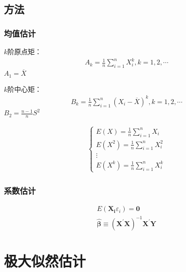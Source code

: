\documentclass[12pt]{book}
\begin{document}
\subsection{方法}

\subsubsection{均值估计}

\par $k$阶原点矩：
\begin{gather*}
    A_k=\frac{1}{n}\sum_{i=1}^{n}{X_i^k}, k=1,2,\cdots
\end{gather*}
$A_1=\overline{X}$
\par $k$阶中心矩：
\begin{gather*}
    B_k=\frac{1}{n}\sum_{i=1}^{n}{(X_i-\overline{X})^k}, k=1,2,\cdots
\end{gather*}
$B_2=\frac{n-1}{n}S^2$

\begin{gather*}
    \begin{cases}
        E(X) = \frac{1}{n}\sum_{i=1}^{n}{X_i}     \\
        E(X^2) = \frac{1}{n}\sum_{i=1}^{n}{X_i^2} \\
        \vdots                                    \\
        E(X^k) = \frac{1}{n}\sum_{i=1}^{n}{X_i^k}
    \end{cases}
\end{gather*}

\subsubsection{系数估计}

\begin{gather*}
    E( \mathbf{X_i} \varepsilon_{i} ) =\mathbf{0} \\
    \hat{\bm{\beta}} \equiv  (\mathbf{X}^{\prime}\mathbf{X})^{-1} \mathbf{X}^{\prime} \mathbf{Y}
\end{gather*}










\section{极大似然估计}
\end{document}
